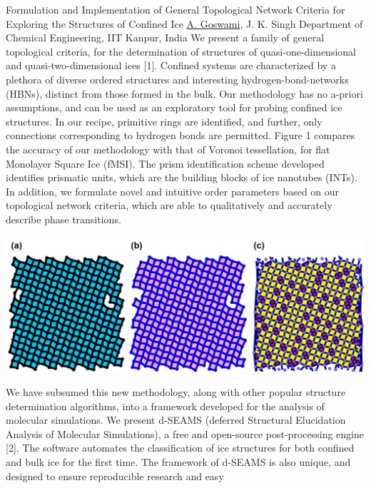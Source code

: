 
    \begin{abstract_online}{Formulation and Implementation of General Topological Network Criteria for Exploring the Structures of Confined Ice}{%
        \underline{A. Goswami}, J. K. Singh}{%
        }{%
        Department of Chemical Engineering, IIT Kanpur, India}
    We present a family of general topological criteria, for the determination of structures of quasi-one-dimensional and quasi-two-dimensional ices [1]. Confined systems are characterized by a plethora of diverse ordered structures and interesting hydrogen-bond-networks (HBNs), distinct from those formed in the bulk. Our methodology has no a-priori assumptions, and can be used as an exploratory tool for probing confined ice structures. In our recipe, primitive rings are identified, and further, only connections corresponding to hydrogen bonds are permitted. Figure 1 compares the accuracy of our methodology with that of Voronoi tessellation, for flat Monolayer Square Ice (fMSI). The prism identification scheme developed identifies prismatic units, which are the building blocks of ice nanotubes (INTs). In addition, we formulate novel and intuitive order parameters based on our topological network criteria, which are able to qualitatively and accurately describe phase transitions. \par  \begin{center}  \includegraphics[width=0.8\linewidth]{abstracts/txt/figures/compareTopoVoro.png}  \caption{\textbf{Figure 1:} Comparison of the accuracy of Voronoi tessellation with our topological network criterion for identifying fMSI. fMSI is known to consist of 4-membered polygons. (a) The top view of the HBN, with 4-membered polygons shaded in cyan. Identification schemes should closely approximate the HBN connectivity. (b) The ring network generated by our topological network criterion, with 4-membered rings shaded in pink. (c) Neighbour bonds created by Voronoi tessellation. The bonds (in black) are generated by connecting neighbouring particles (blue) which share a Voronoi face. Polygons thus formed, with three and four edges, are coloured in red and yellow, respectively. The Voronoi cells are 5-membered and 4-membered polygons, depending on the coordination number.}  \end{center} We have subsumed this new methodology, along with other popular structure determination algorithms, into a framework developed for the analysis of molecular simulations. We present d-SEAMS (deferred Structural Elucidation Analysis of Molecular Simulations), a free and open-source post-processing engine [2]. The software automates the classification of ice structures for both confined and bulk ice for the first time. The framework of d-SEAMS is also unique, and designed to ensure reproducible research and easy 
\end{abstract_online}
